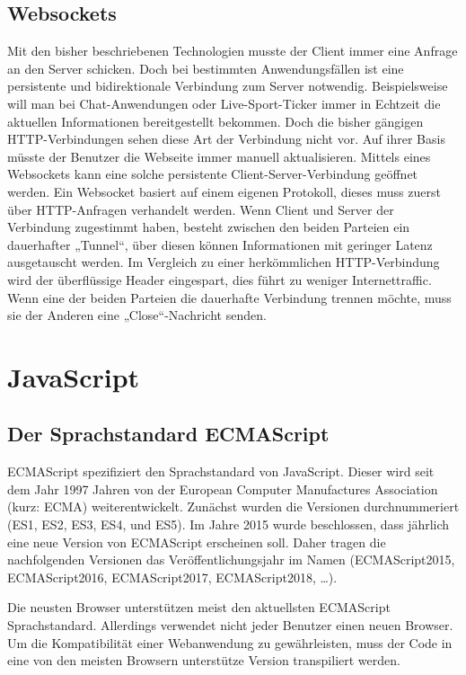 \subsection{Websockets}

Mit den bisher beschriebenen Technologien musste der Client immer eine Anfrage an den Server schicken. Doch bei bestimmten Anwendungsfällen ist eine persistente und bidirektionale Verbindung zum Server notwendig. Beispielsweise will man bei Chat-Anwendungen oder Live-Sport-Ticker immer in Echtzeit die aktuellen Informationen bereitgestellt bekommen. Doch die bisher gängigen HTTP-Verbindungen sehen diese Art der Verbindung nicht vor. Auf ihrer Basis müsste der Benutzer die Webseite immer manuell aktualisieren. Mittels eines Websockets kann eine solche persistente Client-Server-Verbindung geöffnet werden. Ein Websocket basiert auf einem eigenen Protokoll, dieses muss zuerst über HTTP-Anfragen verhandelt werden. Wenn Client und Server der Verbindung zugestimmt haben, besteht zwischen den beiden Parteien ein dauerhafter „Tunnel“, über diesen können Informationen mit geringer Latenz ausgetauscht werden. Im Vergleich zu einer herkömmlichen HTTP-Verbindung wird der überflüssige Header eingespart, dies führt zu weniger Internettraffic. Wenn eine der beiden Parteien die dauerhafte Verbindung trennen möchte, muss sie der Anderen eine „Close“-Nachricht senden.\autocites[vgl.][11\psqq]{Fink2014}

\section{JavaScript}\label{sec:js}

\subsection{Der Sprachstandard ECMAScript}\label{sec:der-sprachstandard-ecmascript}
ECMAScript spezifiziert den Sprachstandard von JavaScript. Dieser wird seit dem Jahr 1997 Jahren von der European Computer Manufactures Association (kurz: ECMA) weiterentwickelt. Zunächst wurden die Versionen durchnummeriert (ES1, ES2, ES3, ES4, und ES5). Im Jahre 2015 wurde beschlossen, dass jährlich eine neue Version von ECMAScript erscheinen soll. Daher tragen die nachfolgenden Versionen das Veröffentlichungsjahr im Namen (ECMAScript2015, ECMAScript2016, ECMAScript2017, ECMAScript2018, …). 

Die neusten Browser unterstützen meist den aktuellsten ECMAScript Sprachstandard. Allerdings verwendet nicht jeder Benutzer einen neuen Browser. Um die Kompatibilität einer Webanwendung zu gewährleisten, muss der Code in eine von den meisten Browsern unterstütze Version transpiliert werden.\autocites[vgl.][27\psqq]{Woiwode.2018}[vgl.][]{Terlson.2018}[vgl.][13\psqq]{Steyer.2017}

